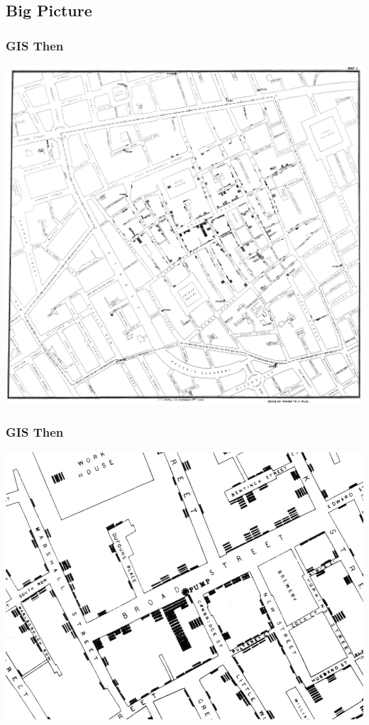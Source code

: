 \documentclass[nototal,handout]{beamer}
\begin{document}
\subsection{Big Picture} 

\begin{frame}
	\frametitle{GIS Then}
 \begin{center}
 \includegraphics[width=.85\linewidth]{snowmap1.pdf}
  \end{center}
 \end{frame} 

\begin{frame}
	\frametitle{GIS Then}
 \begin{center}
 \includegraphics[width=.85\linewidth]{snowmap3.png}
  \end{center}
 \end{frame} 
\end{document}
